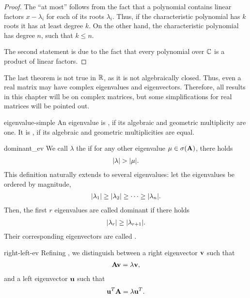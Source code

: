 \begin{proof}
  The ``at most'' follows from the fact that a polynomial contains
  linear factors $x-\lambda_i$ for each of its roots
  $\lambda_i$. Thus, if the characteristic polynomial has $k$ roots it
  has at least degree $k$. On the other hand, the characteristic
  polynomial has degree $n$, such that $k\le n$.

  The second statement is due to the fact that every polynomial over
  $\mathbb C$ is a product of linear factors.
\end{proof}

\begin{remark}
  The last theorem is not true in $\mathbb R$, as it is not algebraically
  closed. Thus, even a real matrix may have complex eigenvalues and
  eigenvectors. Therefore, all results in this chapter will be on
  complex matrices, but some simplifications for real matrices will be
  pointed out.
\end{remark}

\begin{Definition}{eigenvalue-simple}
  An eigenvalue is , if its algebraic and geometric multiplicity are one. It is , if its algebraic and geometric multiplicities are equal.
\end{Definition}

\begin{Definition}{dominant_ev}
  We call $\lambda$ the  if for any other
  eigenvalue $\mu\in\sigma(\mathbf A)$, there holds
  \begin{gather}
    \lvert\lambda\rvert > \lvert\mu\rvert.
  \end{gather}
  This definition naturally extends to several eigenvalues: let the
  eigenvalues be ordered by magnitude,
  \begin{gather}
    \lvert\lambda_{1}\rvert \ge \lvert\lambda_{2}\rvert \ge \dots \ge \lvert\lambda_{n}\rvert.
  \end{gather}
  Then, the first $r$ eigenvalues are called dominant if there holds
  \begin{gather}
    \lvert\lambda_{r}\rvert \ge\lvert\lambda_{r+1}\rvert.
  \end{gather}
  Their corresponding eigenvectors are called .
\end{Definition}
\begin{Definition}{right-left-ev}
  Refining , we distinguish between a right eigenvector $\mathbf v$ such that
  \begin{gather*}
    \mathbf A \mathbf v = \lambda \mathbf v,
  \end{gather*}
  and a left eigenvector $\mathbf u$ such that
  \begin{gather*}
    \mathbf u^T \mathbf A = \lambda \mathbf u^T.
  \end{gather*}
\end{Definition}

